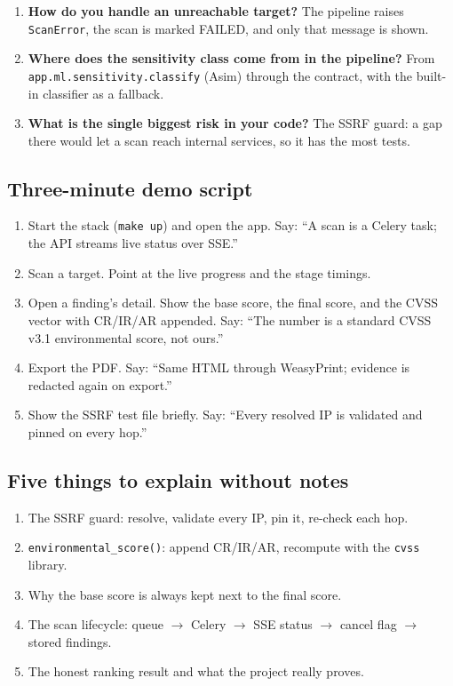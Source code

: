 \begin{enumerate}[leftmargin=*,itemsep=3pt]
per scan, and per-stage timings are recorded in \texttt{stats[stage\_seconds]}.
\item \textbf{How do you handle an unreachable target?} The pipeline raises
\texttt{ScanError}, the scan is marked FAILED, and only that message is shown.
\item \textbf{Where does the sensitivity class come from in the pipeline?} From
\texttt{app.ml.sensitivity.classify} (Asim) through the contract, with the
built-in classifier as a fallback.
\item \textbf{What is the single biggest risk in your code?} The SSRF guard: a
gap there would let a scan reach internal services, so it has the most tests.
\end{enumerate}

\subsection{Three-minute demo script}
\begin{enumerate}[leftmargin=*]
\item Start the stack (\texttt{make up}) and open the app. Say: ``A scan is a
Celery task; the API streams live status over SSE.''
\item Scan a target. Point at the live progress and the stage timings.
\item Open a finding's detail. Show the base score, the final score, and the CVSS
vector with CR/IR/AR appended. Say: ``The number is a standard CVSS v3.1
environmental score, not ours.''
\item Export the PDF. Say: ``Same HTML through WeasyPrint; evidence is redacted
again on export.''
\item Show the SSRF test file briefly. Say: ``Every resolved IP is validated and
pinned on every hop.''
\end{enumerate}

\subsection{Five things to explain without notes}
\begin{enumerate}[leftmargin=*]
\item The SSRF guard: resolve, validate every IP, pin it, re-check each hop.
\item \texttt{environmental\_score()}: append CR/IR/AR, recompute with the
\texttt{cvss} library.
\item Why the base score is always kept next to the final score.
\item The scan lifecycle: queue $\rightarrow$ Celery $\rightarrow$ SSE status
$\rightarrow$ cancel flag $\rightarrow$ stored findings.
\item The honest ranking result and what the project really proves.
\end{enumerate}



